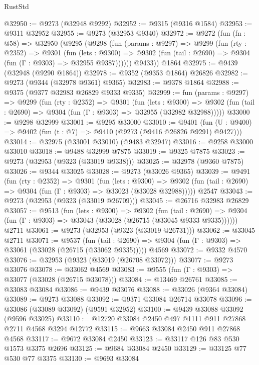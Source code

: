 \begin{lexlean}{RustStd}
\begin{coremodule}
@32950 := @9273 (@32948 @9292)
@32952 := @9315 (@9316 @1584)
@32953 := @9311 @32952
@32955 := @9273 (@32953 @9340)
@32972 := @9272
    (fun (fn : @58) =>
    @32950
      (@9295
        (@9298
          (fun (params : @9297) =>
          @9299
            (fun (rty : @2352) =>
            @9301
              (fun (lets : @9300) =>
              @9302 (fun (tail : @2690) => @9304 (fun (Γ : @9303) => @32955 @9387))))))
        @9433))
    @1864
@32975 := @9439 (@32948 (@9290 @1864))
@32978 := @9352 (@9353 @1864) @26826
@32982 := @9273 (@9344 (@32978 @9361) @9365)
@32983 := @9378 @1864
@32988 := @9375 (@9377 @32983 @26829 @9333 @9335)
@32999 := fun (params : @9297) =>
  @9299
    (fun (rty : @2352) =>
    @9301
      (fun (lets : @9300) =>
      @9302 (fun (tail : @2690) => @9304 (fun (Γ : @9303) => @32955 (@32982 @32988)))))
@33000 := @9298 @32999
@33001 := @9295 @33000
@33010 := @9401
    (fun (U : @9400) => @9402 (fun (t : @7) => @9410 (@9273 (@9416 @26826 @9291) @9427)))
@33014 := @32975 (@33001 @33010) (@9483 @32947)
@33016 := @9258 @33000 @33010
@33018 := @9488 @32999 @7875
@33019 := @9325 @7875
@33023 := @9273 (@32953 (@9323 (@33019 @9338)))
@33025 := @32978 (@9360 @7875)
@33026 := @9344 @33025
@33028 := @9273 (@33026 @9365)
@33039 := @9491
    (fun (rty : @2352) =>
    @9301
      (fun (lets : @9300) =>
      @9302 (fun (tail : @2690) => @9304 (fun (Γ : @9303) => @33023 (@33028 @32988)))))
    @2547
@33043 := @9273 (@32953 (@9323 (@33019 @26709)))
@33045 := @26716 @32983 @26829
@33057 := @9513
    (fun (lets : @9300) =>
    @9302
      (fun (tail : @2690) =>
      @9304 (fun (Γ : @9303) => @33043 (@33028 (@26715 (@33045 @9333 @9335))))))
    @2711
@33061 := @9273 (@32953 (@9323 (@33019 @26731)))
@33062 := @33045 @2711
@33071 := @9537
    (fun (tail : @2690) => @9304 (fun (Γ : @9303) => @33061 (@33028 (@26715 (@33062 @9335)))))
    @4569
@33072 := @9332 @4570
@33076 := @32953 (@9323 (@33019 (@26708 @33072)))
@33077 := @9273 @33076
@33078 := @33062 @4569
@33083 := @9555 (fun (Γ : @9303) => @33077 (@33028 (@26715 @33078)))
@33084 := @13469 @26761
@33085 := @33083 @33084
@33086 := @9439 @33076
@33088 := @33026 (@9364 @33084)
@33089 := @9273 @33088
@33092 := @9371 @33084 @26714 @33078
@33096 := @33086 (@33089 @33092) (@9591 @32952)
@33100 := @9439 @33088 @33092 (@9596 @33025)
@33110 := @12720 @33084 @2450 @497 @1111 @911 @27868 @2711 @4568 @3294 @12772
@33115 := @9663 @33084 @2450 @911 @27868 @4568
@33117 := @9672 @33084 @2450
@33123 := @33117 @126 @83 @530 @1573 @3375 @2696
@33125 := @9684 @33084 @2450
@33129 := @33125 @77 @530 @77 @3375
@33130 := @9693 @33084

\end{coremodule}
\end{lexlean}
